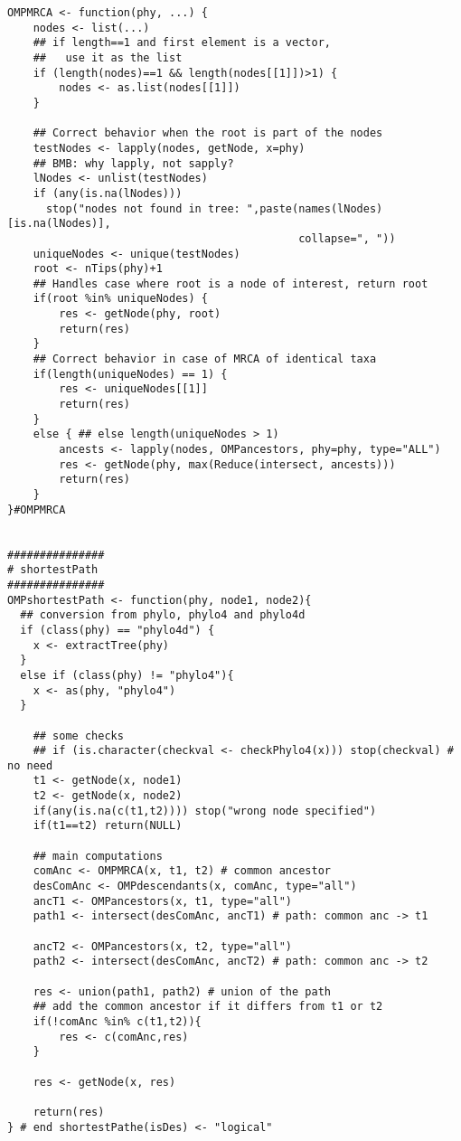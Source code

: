 \documentclass[11pt,letterpaper]{article}
\begin{document}
\begin{lstlisting}[style=MyR]
OMPMRCA <- function(phy, ...) {
    nodes <- list(...)
    ## if length==1 and first element is a vector,
    ##   use it as the list
    if (length(nodes)==1 && length(nodes[[1]])>1) {
        nodes <- as.list(nodes[[1]])
    }

    ## Correct behavior when the root is part of the nodes
    testNodes <- lapply(nodes, getNode, x=phy)
    ## BMB: why lapply, not sapply?
    lNodes <- unlist(testNodes)
    if (any(is.na(lNodes)))
      stop("nodes not found in tree: ",paste(names(lNodes)[is.na(lNodes)],
                                             collapse=", "))
    uniqueNodes <- unique(testNodes)
    root <- nTips(phy)+1
    ## Handles case where root is a node of interest, return root
    if(root %in% uniqueNodes) {
        res <- getNode(phy, root)
        return(res)
    }
    ## Correct behavior in case of MRCA of identical taxa
    if(length(uniqueNodes) == 1) {
        res <- uniqueNodes[[1]]
        return(res)
    }
    else { ## else length(uniqueNodes > 1)
        ancests <- lapply(nodes, OMPancestors, phy=phy, type="ALL")
        res <- getNode(phy, max(Reduce(intersect, ancests)))
        return(res)
    }
}#OMPMRCA


###############
# shortestPath
###############
OMPshortestPath <- function(phy, node1, node2){
  ## conversion from phylo, phylo4 and phylo4d
  if (class(phy) == "phylo4d") {
    x <- extractTree(phy)
  }
  else if (class(phy) != "phylo4"){
    x <- as(phy, "phylo4")
  }

    ## some checks
    ## if (is.character(checkval <- checkPhylo4(x))) stop(checkval) # no need
    t1 <- getNode(x, node1)
    t2 <- getNode(x, node2)
    if(any(is.na(c(t1,t2)))) stop("wrong node specified")
    if(t1==t2) return(NULL)

    ## main computations
    comAnc <- OMPMRCA(x, t1, t2) # common ancestor
    desComAnc <- OMPdescendants(x, comAnc, type="all")
    ancT1 <- OMPancestors(x, t1, type="all")
    path1 <- intersect(desComAnc, ancT1) # path: common anc -> t1

    ancT2 <- OMPancestors(x, t2, type="all")
    path2 <- intersect(desComAnc, ancT2) # path: common anc -> t2

    res <- union(path1, path2) # union of the path
    ## add the common ancestor if it differs from t1 or t2
    if(!comAnc %in% c(t1,t2)){
        res <- c(comAnc,res)
    }

    res <- getNode(x, res)

    return(res)
} # end shortestPathe(isDes) <- "logical"


\end{lstlisting}
\end{document}
